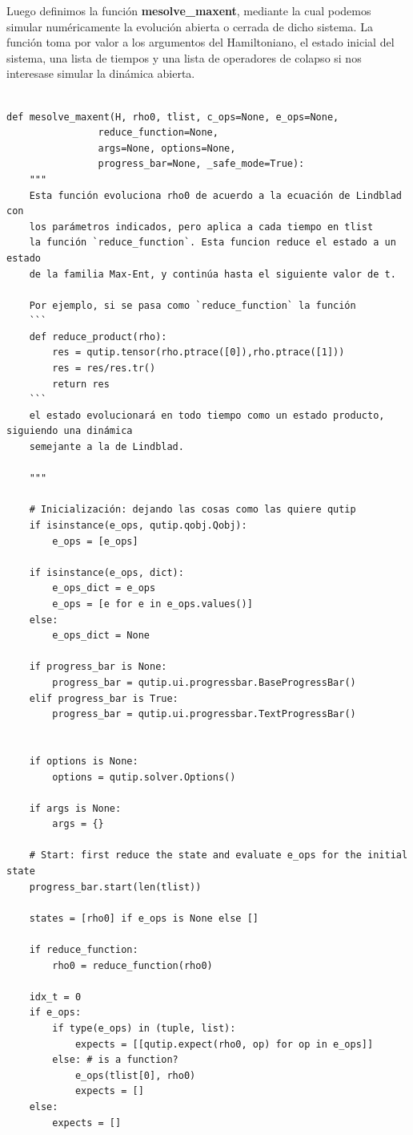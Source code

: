 \documentclass{report} %
\numberwithin{equation}{section}
\begin{document}
Luego definimos la función \textbf{mesolve_maxent}, mediante la cual podemos simular numéricamente la evolución abierta o cerrada de dicho sistema. La función toma por valor a los argumentos del Hamiltoniano, el estado inicial del sistema, una lista de tiempos y una lista de operadores de colapso si nos interesase simular la dinámica abierta.

\begin{verbatim}
    
def mesolve_maxent(H, rho0, tlist, c_ops=None, e_ops=None, 
                reduce_function=None,
                args=None, options=None, 
                progress_bar=None, _safe_mode=True):
    """
    Esta función evoluciona rho0 de acuerdo a la ecuación de Lindblad con 
    los parámetros indicados, pero aplica a cada tiempo en tlist 
    la función `reduce_function`. Esta funcion reduce el estado a un estado
    de la familia Max-Ent, y continúa hasta el siguiente valor de t.
    
    Por ejemplo, si se pasa como `reduce_function` la función
    ```
    def reduce_product(rho):
        res = qutip.tensor(rho.ptrace([0]),rho.ptrace([1]))
        res = res/res.tr()
        return res
    ```
    el estado evolucionará en todo tiempo como un estado producto, siguiendo una dinámica
    semejante a la de Lindblad.
    
    """
    
    # Inicialización: dejando las cosas como las quiere qutip
    if isinstance(e_ops, qutip.qobj.Qobj):
        e_ops = [e_ops]

    if isinstance(e_ops, dict):
        e_ops_dict = e_ops
        e_ops = [e for e in e_ops.values()]
    else:
        e_ops_dict = None
        
    if progress_bar is None:
        progress_bar = qutip.ui.progressbar.BaseProgressBar()
    elif progress_bar is True:
        progress_bar = qutip.ui.progressbar.TextProgressBar()
    
    
    if options is None:
        options = qutip.solver.Options()
    
    if args is None:
        args = {}

    # Start: first reduce the state and evaluate e_ops for the initial state
    progress_bar.start(len(tlist))
    
    states = [rho0] if e_ops is None else []

    if reduce_function:
        rho0 = reduce_function(rho0)

    idx_t = 0
    if e_ops:
        if type(e_ops) in (tuple, list):
            expects = [[qutip.expect(rho0, op) for op in e_ops]]
        else: # is a function?
            e_ops(tlist[0], rho0)
            expects = []
    else:
        expects = []
    

\end{verbatim}
\end{document}
